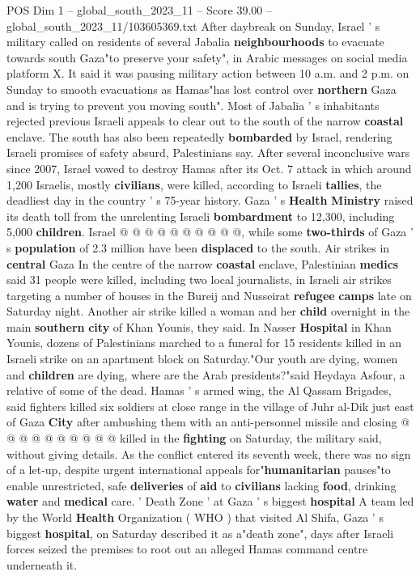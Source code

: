 \begin{textsample}{POS Dim 1 – global\_south\_2023\_11 – Score 39.00 – global\_south\_2023\_11/103605369.txt}
After daybreak on Sunday, Israel ' s military called on residents of several Jabalia \textbf{neighbourhoods} to evacuate towards south Gaza"to preserve your safety", in Arabic messages on social media platform X.
It said it was pausing military action between 10 a.m. and 2 p.m. on Sunday to smooth evacuations as Hamas"has lost control over \textbf{northern} Gaza and is trying to prevent you moving south".
Most of Jabalia ' s inhabitants rejected previous Israeli appeals to clear out to the south of the narrow \textbf{coastal} enclave.
The south has also been repeatedly \textbf{bombarded} by Israel, rendering Israeli promises of safety absurd, Palestinians say.
After several inconclusive wars since 2007, Israel vowed to destroy Hamas after its Oct. 7 attack in which around 1,200 Israelis, mostly \textbf{civilians}, were killed, according to Israeli \textbf{tallies}, the deadliest day in the country ' s 75-year history.
Gaza ' s \textbf{Health} \textbf{Ministry} raised its death toll from the unrelenting Israeli \textbf{bombardment} to 12,300, including 5,000 \textbf{children}.
Israel @ @ @ @ @ @ @ @ @ @, while some \textbf{two-thirds} of Gaza ' s \textbf{population} of 2.3 million have been \textbf{displaced} to the south.
Air strikes in \textbf{central} Gaza In the centre of the narrow \textbf{coastal} enclave, Palestinian \textbf{medics} said 31 people were killed, including two local journalists, in Israeli air strikes targeting a number of houses in the Bureij and Nusseirat \textbf{refugee} \textbf{camps} late on Saturday night.
Another air strike killed a woman and her \textbf{child} overnight in the main \textbf{southern} \textbf{city} of Khan Younis, they said.
In Nasser \textbf{Hospital} in Khan Younis, dozens of Palestinians marched to a funeral for 15 residents killed in an Israeli strike on an apartment block on Saturday."Our youth are dying, women and \textbf{children} are dying, where are the Arab presidents?"said Heydaya Asfour, a relative of some of the dead.
Hamas ' s armed wing, the Al Qassam Brigades, said fighters killed six soldiers at close range in the village of Juhr al-Dik just east of Gaza \textbf{City} after ambushing them with an anti-personnel missile and closing @ @ @ @ @ @ @ @ @ @ killed in the \textbf{fighting} on Saturday, the military said, without giving details.
As the conflict entered its seventh week, there was no sign of a let-up, despite urgent international appeals for"\textbf{humanitarian} pauses"to enable unrestricted, safe \textbf{deliveries} of \textbf{aid} to \textbf{civilians} lacking \textbf{food}, drinking \textbf{water} and \textbf{medical} care. ' Death Zone ' at Gaza ' s biggest \textbf{hospital} A team led by the World \textbf{Health} Organization ( WHO ) that visited Al Shifa, Gaza ' s biggest \textbf{hospital}, on Saturday described it as a"death zone", days after Israeli forces seized the premises to root out an alleged Hamas command centre underneath it.

\end{textsample}
